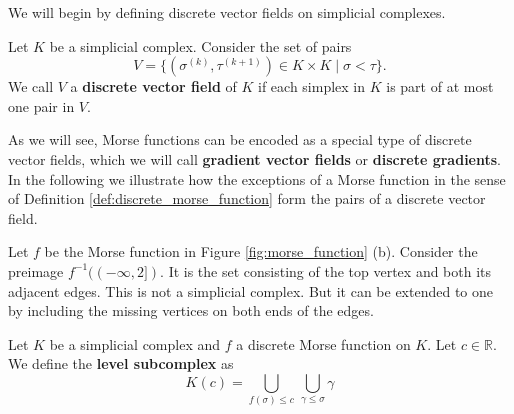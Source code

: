 We will begin by defining discrete vector fields on simplicial complexes.

\begin{defi}
Let $K$ be a simplicial complex. Consider the set of pairs
\[
V = \{(\sigma^{(k)}, \tau^{(k+1)}) \in K \times K \mid \sigma < \tau\}.
\]
We call $V$ a \textbf{discrete vector field} of $K$ if each simplex in $K$ is part of at most one pair in $V$.
\label{def:discrete_vector_field}
\end{defi}



% 


As we will see, Morse functions can be encoded as a special type of discrete vector fields, which we will call \textbf{gradient vector fields} or \textbf{discrete gradients}. In the following we illustrate how the exceptions of a Morse function in the sense of Definition \ref{def:discrete_morse_function} form the pairs of a discrete vector field.

Let $f$ be the Morse function in Figure \ref{fig:morse_function} (b).
Consider the preimage $f^{-1}((-\infty,2])$. It is the set consisting of the top vertex and both its adjacent edges. This is not a simplicial complex. But it can be extended to one by including the missing vertices on both ends of the edges.

\begin{defi}
Let $K$ be a simplicial complex and $f$ a discrete Morse function on $K$. Let $c \in \mathbb{R}$. We define the \textbf{level subcomplex} as 
\[
K(c) = \bigcup_{f(\sigma)\leq c} \, \bigcup_{\gamma\leq\sigma} \gamma
\]
\end{defi}

